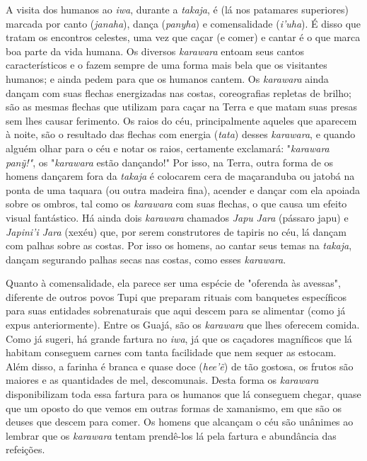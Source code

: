 A visita dos humanos ao \emph{iwa}, durante a \emph{takaja}, é (lá nos
patamares superiores) marcada por canto (\emph{janaha}), dança
(\emph{panyha}) e comensalidade (\emph{i'uha}). É disso que tratam os
encontros celestes, uma vez que caçar (e comer) e cantar é o que marca
boa parte da vida humana. Os diversos \emph{karawara} entoam seus cantos
característicos e o fazem sempre de uma forma mais bela que os
visitantes humanos; e ainda pedem para que os humanos cantem. Os
\emph{karawara} ainda dançam com suas flechas energizadas nas costas,
coreografias repletas de brilho; são as mesmas flechas que utilizam para
caçar na Terra e que matam suas presas sem lhes causar ferimento. Os
raios do céu, principalmente aqueles que aparecem à noite, são o
resultado das flechas com energia (\emph{tata}) desses \emph{karawara},
e quando alguém olhar para o céu e notar os raios, certamente exclamará:
"\emph{karawara} \emph{panỹ!"}, os "\emph{karawara} estão dançando!" Por
isso, na Terra, outra forma de os homens dançarem fora da \emph{takaja}
é colocarem cera de maçaranduba ou jatobá na ponta de uma taquara (ou
outra madeira fina), acender e dançar com ela apoiada sobre os ombros,
tal como os \emph{karawara} com suas flechas, o que causa um efeito
visual fantástico. Há ainda dois \emph{karawara} chamados \emph{Japu}
\emph{Jara} (pássaro japu) e \emph{Japini'i Jara} (xexéu) que, por serem
construtores de tapiris no céu, lá dançam com palhas sobre as costas.
Por isso os homens, ao cantar seus temas na \emph{takaja}, dançam
segurando palhas secas nas costas, como esses \emph{karawara}.

Quanto à comensalidade, ela parece ser uma espécie de "oferenda às
avessas", diferente de outros povos Tupi que preparam rituais com
banquetes específicos para suas entidades sobrenaturais que aqui descem
para se alimentar (como já expus anteriormente). Entre os Guajá, são os
\emph{karawara} que lhes oferecem comida. Como já sugeri, há grande
fartura no \emph{iwa}, já que os caçadores magníficos que lá habitam
conseguem carnes com tanta facilidade que nem sequer as estocam. Além
disso, a farinha é branca e quase doce (\emph{hee'ẽ}) de tão gostosa, os
frutos são maiores e as quantidades de mel, descomunais. Desta forma os
\emph{karawara} disponibilizam toda essa fartura para os humanos que lá
conseguem chegar, quase que um oposto do que vemos em outras formas de
xamanismo, em que são os deuses que descem para comer. Os homens que
alcançam o céu são unânimes ao lembrar que os \emph{karawara} tentam
prendê-los lá pela fartura e abundância das refeições.

